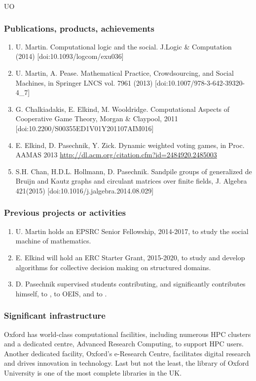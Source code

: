 \begin{sitedescription}{UO}
\subsubsection*{Publications, products, achievements}
\begin{enumerate}
\item U. Martin. Computational logic and the social. J.Logic \& Computation (2014) [doi:10.1093/logcom/exu036]
\item U. Martin, A. Pease. Mathematical Practice, Crowdsourcing, and Social Machines, in Springer LNCS vol. 7961 (2013) [doi:10.1007/978-3-642-39320-4\_7]
\item G. Chalkiadakis, E. Elkind, M. Wooldridge. Computational Aspects of Cooperative Game Theory, Morgan \& Claypool, 2011 [doi:10.2200/S00355ED1V01Y201107AIM016]
\item E. Elkind, D. Pasechnik, Y. Zick. Dynamic weighted voting games, in Proc. AAMAS 2013 
\url{http://dl.acm.org/citation.cfm?id=2484920.2485003}
\item S.H. Chan, H.D.L. Hollmann, D. Pasechnik. Sandpile groups of generalized de Bruijn and Kautz graphs and circulant matrices over finite fields,
J. Algebra 421(2015) [doi:10.1016/j.jalgebra.2014.08.029]
\end{enumerate}

\subsubsection*{Previous projects or activities}

\begin{enumerate}
\item %
U. Martin holds an EPSRC Senior Fellowship, 2014-2017, to study the social machine of mathematics.
\item E. Elkind will hold an ERC Starter Grant, 2015-2020, to study and develop algorithms for collective decision
making on structured domains.
\item D. Pasechnik supervised  students contributing,  and significantly contributes himself, to \Sage, to OEIS, and to \GAP.
\end{enumerate}

\subsubsection*{Significant infrastructure}
Oxford has world-class computational facilities, including numerous HPC clusters and a dedicated
centre, Advanced Research Computing, to support HPC users.
Another dedicated facility, Oxford's e-Research Centre, facilitates 
digital research and drives innovation in technology. Last but not the least,
the library of Oxford University is one of the most complete libraries in the UK.
\end{sitedescription}







